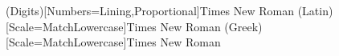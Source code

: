 \usepackage[english,french]{babel}

\addto{}



\usepackage{amsmath}



\usepackage{mathspec}
\setmainfont[Mapping=tex-text, Numbers={Lining,Proportional}]{Times New Roman} 
\setmathsfont(Digits)[Numbers={Lining,Proportional}]{Times New Roman}
\setmathsfont(Latin)[Scale=MatchLowercase]{Times New Roman}
\setmathsfont(Greek)[Scale=MatchLowercase]{Times New Roman}


